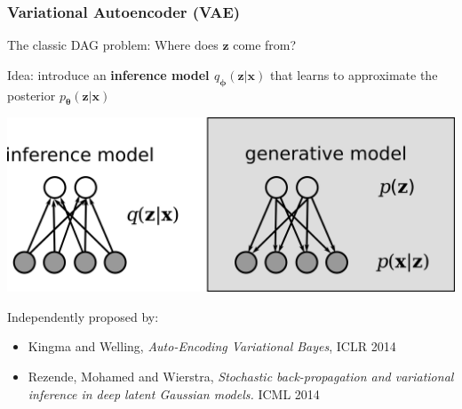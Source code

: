 \documentclass[11pt,mathserif]{beamer}
\renewcommand{\vec}[1]{{\boldsymbol{ #1}}}
\newcommand{\xVec}{\vec{x}}
\newcommand{\hVec}{\vec{h}}
\begin{document}
 \begin{frame}
\frametitle{Variational Autoencoder (VAE)}

The classic DAG problem: Where does $\vec z$ come from?

Idea: introduce an \textbf{inference model $q_{\vec \phi }(\vec z| \vec x)$}  that learns to approximate the posterior   $p_{\vec \theta}(\vec z| \vec x )$

\hspace{1.5cm}\includegraphics[width=0.7\framewidth]{VAE-full.png}


Independently proposed by:
\begin{itemize}
\item Kingma and Welling, \emph{Auto-Encoding Variational Bayes}, ICLR 2014
\item Rezende, Mohamed and Wierstra, \emph{Stochastic back-propagation and variational inference in deep latent Gaussian models.} ICML 2014
\end{itemize}

%


%


\end{frame}
\end{document}

